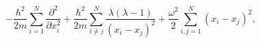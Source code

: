 \begin{equation}  
	- \frac{\hbar^{2}}{2m} 
	\sum_{i=1}^{N} \frac {\partial ^{2}}{\partial x_{i}^2} +
	\frac{\hbar^{2}}{2m}
	\sum_{i\neq j}^{N} 
	\frac {\lambda(\lambda-1)}{(x_{i}-x_{j})^{2}}+
	\frac{\omega^{2}}{2} \sum_{i,j=1}^{N} (x_{i}-x_{j})^{2},	
\end{equation}

